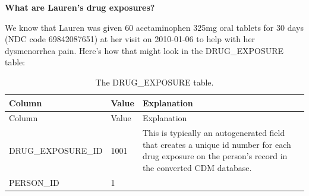 \documentclass[]{book}
\begin{document}
\textbf{What are Lauren's drug exposures?}

We know that Lauren was given 60 acetaminophen 325mg oral tablets for 30
days (NDC code 69842087651) at her visit on 2010-01-06 to help with her
dysmenorrhea pain. Here's how that might look in the DRUG\_EXPOSURE
table:

\begin{longtable}[]{@{}lll@{}}
\caption{\label{tab:drugExposure} The DRUG\_EXPOSURE table.}\tabularnewline
\toprule
\begin{minipage}[b]{0.30\columnwidth}\raggedright\strut
Column\strut
\end{minipage} & \begin{minipage}[b]{0.14\columnwidth}\raggedright\strut
Value\strut
\end{minipage} & \begin{minipage}[b]{0.47\columnwidth}\raggedright\strut
Explanation\strut
\end{minipage}\tabularnewline
\midrule
\endfirsthead
\toprule
\begin{minipage}[b]{0.30\columnwidth}\raggedright\strut
Column\strut
\end{minipage} & \begin{minipage}[b]{0.14\columnwidth}\raggedright\strut
Value\strut
\end{minipage} & \begin{minipage}[b]{0.47\columnwidth}\raggedright\strut
Explanation\strut
\end{minipage}\tabularnewline
\midrule
\endhead
\begin{minipage}[t]{0.30\columnwidth}\raggedright\strut
DRUG\_EXPOSURE\_ID\strut
\end{minipage} & \begin{minipage}[t]{0.14\columnwidth}\raggedright\strut
1001\strut
\end{minipage} & \begin{minipage}[t]{0.47\columnwidth}\raggedright\strut
This is typically an autogenerated field that creates a unique id number
for each drug exposure on the person's record in the converted CDM
database.\strut
\end{minipage}\tabularnewline
\begin{minipage}[t]{0.30\columnwidth}\raggedright\strut
PERSON\_ID\strut
\end{minipage} & \begin{minipage}[t]{0.14\columnwidth}\raggedright\strut
1\strut
\end{minipage} & \begin{minipage}[t]{0.47\columnwidth}\raggedright\strut

\end{minipage}
\end{longtable}
\end{document}
